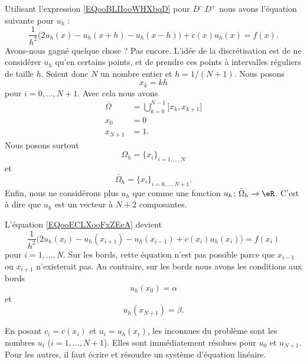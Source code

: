 Utilisant l'expression \eqref{EQooBLIIooWHXbqD} pour \( D^-D^+\) nous avons l'équation suivante pour \( u_h\) :
\begin{equation}        \label{EQooECLXooFxZEeA}
    \frac{1}{ h^2 }\Big( 2u_h(x)-u_h(x+h)-u_h(x-h) \Big)+c(x)u_h(x)=f(x).
\end{equation}
Avons-nous gagné quelque chose ? Pas encore. L'idée de la discrétisation est de ne considérer \( u_h\) qu'en certains points, et de prendre ces points à intervalles réguliers de taille \( h\). Soient donc \( N\) un nombre entier et \( h=1/(N+1)\). Nous posons
\begin{equation}
    x_k=kh
\end{equation}
pour \( i=0,\ldots, N+1\). Avec cela nous avons
\begin{subequations}
    \begin{align}
        \overline{ \Omega }&=\bigcup_{k=0}^{N-1}\mathopen[ x_k , x_{k+1} \mathclose]\\
        x_0&=0\\
        x_{N+1}&=1.
    \end{align}
\end{subequations}
Nous posons surtout
\begin{equation}
    \Omega_h=\{ x_i \}_{i=1,\ldots, N}
\end{equation}
et
\begin{equation}
    \bar\Omega_h=\{ x_i \}_{i=0,\ldots, N+1}.
\end{equation}
Enfin, nous ne considérons plus \( u_h\) que comme une fonction \( u_h\colon \bar\Omega_h\to \eR\). C'est à dire que \( u_h\) est un vecteur à \( N+2\) composantes.

L'équation \eqref{EQooECLXooFxZEeA} devient
\begin{equation}        \label{EQooZMVMooTqlpkF}
    \frac{1}{ h^2 }\big( 2u_h(x_i)-u_h(x_{i+1})-u_h(x_{i-1})+c(x_i)u_h(x_i) \big)=f(x_i)
\end{equation}
pour \( i=1,\ldots, N\). Sur les bords, cette équation n'est pas possible parce que \( x_{i-1}\) ou \( x_{i+1}\) n'existerait pas. Au contraire, sur les bords nous avons les conditions aux bords
\begin{equation}
    u_h(x_0)=\alpha
\end{equation}
et
\begin{equation}
    u_h(x_{N+1})=\beta.
\end{equation}

En posant \( c_i=c(x_i)\) et \( u_i=u_h(x_i)\), les inconnues du problème sont les nombres \( u_i\) (\( i=1,\ldots, N+1\)). Elles sont immédiatement résolues pour \( u_0\) et \( u_{N+1}\). Pour les autres, il faut écrire et résoudre un système d'équation linéaire.

